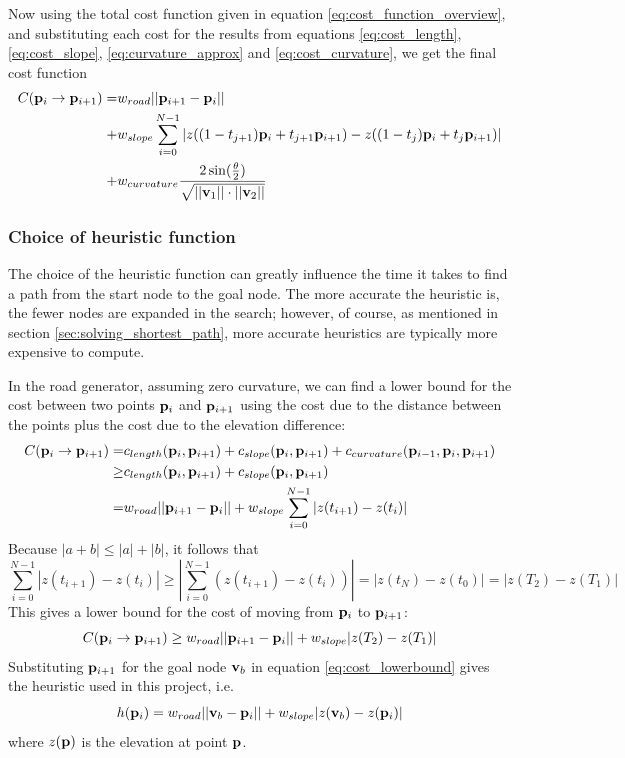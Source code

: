 Now using the total cost function given in equation \ref{eq:cost_function_overview}, and substituting each cost for the results from equations \ref{eq:cost_length}, \ref{eq:cost_slope}, \ref{eq:curvature_approx} and \ref{eq:cost_curvature}, we get the final cost function
\begin{align}
C({\mathbf p}_i \to {\mathbf p}_{i+1}) =& w_{road}||{\mathbf p}_{i+1} - {\mathbf p}_i||\notag\\
                                 +& w_{slope}\sum_{i=0}^{N-1} |z((1-t_{j+1}){\mathbf p}_i+t_{j+1}{\mathbf p}_{i+1})-z((1-t_j){\mathbf p}_i+t_j{\mathbf p}_{i+1})|\notag\\ 
                                 +& w_{curvature}\frac{2\sin(\frac{\theta}{2})}{\sqrt{||{\mathbf v}_1||\cdot ||{\mathbf v}_2||}}
\end{align}

\subsubsection{Choice of heuristic function}
The choice of the heuristic function can greatly influence the time it takes to find a path from the start node to the goal node. The more accurate the heuristic is, the fewer nodes are expanded in the search; however, of course, as mentioned in section \ref{sec:solving_shortest_path}, more accurate heuristics are typically more expensive to compute.

In the road generator, assuming zero curvature, we can find a lower bound for the cost between two points ${\mathbf p}_i$ and ${\mathbf p}_{i+1}$ using the cost due to the distance between the points plus the cost due to the elevation difference:
\begin{align*}
C({\mathbf p}_i \to {\mathbf p}_{i+1}) = & c_{length}({\mathbf p}_i, {\mathbf p}_{i+1}) + c_{slope}({\mathbf p}_i, {\mathbf p}_{i+1}) + c_{curvature}({\mathbf p}_{i-1}, {\mathbf p}_i, {\mathbf p}_{i+1})\\
                                 \geq & c_{length}({\mathbf p}_i, {\mathbf p}_{i+1}) + c_{slope}({\mathbf p}_i, {\mathbf p}_{i+1}) \\
                                 = & w_{road}||{\mathbf p}_{i+1} - {\mathbf p}_i|| + w_{slope}\sum_{i=0}^{N-1} |z(t_{i+1})-z(t_i)|
\end{align*}
Because $|a+b| \leq |a|+|b|$, it follows that
$$
\sum_{i=0}^{N-1} |z(t_{i+1})-z(t_i)| \geq \left|\sum_{i=0}^{N-1} (z(t_{i+1})-z(t_i))\right| = |z(t_{N})-z(t_0)| = |z(T_2)-z(T_1)|
$$
This gives a lower bound for the cost of moving from ${\mathbf p}_i$ to ${\mathbf p}_{i+1}$:
\begin{equation}
C({\mathbf p}_i \to {\mathbf p}_{i+1}) \geq w_{road}||{\mathbf p}_{i+1} - {\mathbf p}_i|| + w_{slope}|z(T_2)-z(T_1)|
\label{eq:cost_lowerbound}
\end{equation}
Substituting ${\mathbf p}_{i+1}$ for the goal node ${\mathbf v}_b$ in equation \ref{eq:cost_lowerbound} gives the heuristic used in this project, i.e.
\begin{equation}
h({\mathbf p}_i) = w_{road}||{\mathbf v}_b - {\mathbf p}_i|| + w_{slope}|z({\mathbf v}_b)-z({\mathbf p}_i)|
\label{eq:astar_heuristic}
\end{equation}
where $z({\mathbf p})$ is the elevation at point ${\mathbf p}$.

